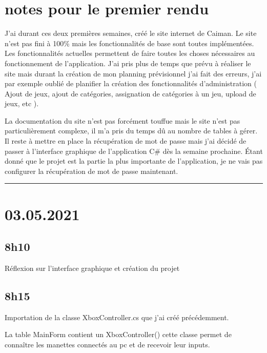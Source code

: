 \documentclass[a4paper,12pt,french]{sphinxmanual}
\begin{document}
\section{notes pour le premier rendu}
\label{\detokenize{logbook:notes-pour-le-premier-rendu}}
\sphinxAtStartPar
J’ai durant ces deux premières semaines, créé le site internet de Caiman. Le site n’est pas fini à 100\% mais les fonctionnalités de base sont toutes implémentées. Les fonctionnalités actuelles permettent de faire toutes les choses nécessaires au fonctionnement de l’application. J’ai pris plus de temps que prévu à réaliser le site mais durant la création de mon planning prévisionnel j’ai fait des erreurs, j’ai par exemple oublié de planifier la création des fonctionnalités d’administration ( Ajout de jeux, ajout de catégories, assignation de catégories à un jeu, upload de jeux, etc ).

\sphinxAtStartPar
La documentation du site n’est pas forcément touffue mais le site n’est pas particulièrement complexe, il m’a pris du temps dû au nombre de tables à gérer. Il reste à mettre en place la récupération de mot de passe mais j’ai décidé de passer à l’interface graphique de l’application C\# dès la semaine prochaine. Étant donné que le projet est la partie la plus importante de l’application, je ne vais pas configurer la récupération de mot de passe maintenant.


\bigskip\hrule\bigskip



\section{03.05.2021}
\label{\detokenize{logbook:id59}}

\subsection{8h10}
\label{\detokenize{logbook:id60}}
\sphinxAtStartPar
Réflexion sur l’interface graphique et création du projet


\subsection{8h15}
\label{\detokenize{logbook:id61}}
\sphinxAtStartPar
Importation de la classe XboxController.cs que j’ai créé précédemment.

\sphinxAtStartPar
{}

\sphinxAtStartPar
La table MainForm contient un XboxController() cette classe permet de connaître les manettes connectés au pc et de recevoir leur inputs.
\end{document}
